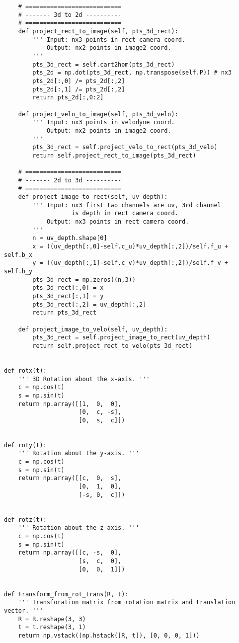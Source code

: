 \begin{lstlisting}
    # =========================== 
    # ------- 3d to 2d ---------- 
    # =========================== 
    def project_rect_to_image(self, pts_3d_rect):
        ''' Input: nx3 points in rect camera coord.
            Output: nx2 points in image2 coord.
        '''
        pts_3d_rect = self.cart2hom(pts_3d_rect)
        pts_2d = np.dot(pts_3d_rect, np.transpose(self.P)) # nx3
        pts_2d[:,0] /= pts_2d[:,2]
        pts_2d[:,1] /= pts_2d[:,2]
        return pts_2d[:,0:2]
    
    def project_velo_to_image(self, pts_3d_velo):
        ''' Input: nx3 points in velodyne coord.
            Output: nx2 points in image2 coord.
        '''
        pts_3d_rect = self.project_velo_to_rect(pts_3d_velo)
        return self.project_rect_to_image(pts_3d_rect)

    # =========================== 
    # ------- 2d to 3d ---------- 
    # =========================== 
    def project_image_to_rect(self, uv_depth):
        ''' Input: nx3 first two channels are uv, 3rd channel
                   is depth in rect camera coord.
            Output: nx3 points in rect camera coord.
        '''
        n = uv_depth.shape[0]
        x = ((uv_depth[:,0]-self.c_u)*uv_depth[:,2])/self.f_u + self.b_x
        y = ((uv_depth[:,1]-self.c_v)*uv_depth[:,2])/self.f_v + self.b_y
        pts_3d_rect = np.zeros((n,3))
        pts_3d_rect[:,0] = x
        pts_3d_rect[:,1] = y
        pts_3d_rect[:,2] = uv_depth[:,2]
        return pts_3d_rect

    def project_image_to_velo(self, uv_depth):
        pts_3d_rect = self.project_image_to_rect(uv_depth)
        return self.project_rect_to_velo(pts_3d_rect)

 
def rotx(t):
    ''' 3D Rotation about the x-axis. '''
    c = np.cos(t)
    s = np.sin(t)
    return np.array([[1,  0,  0],
                     [0,  c, -s],
                     [0,  s,  c]])


def roty(t):
    ''' Rotation about the y-axis. '''
    c = np.cos(t)
    s = np.sin(t)
    return np.array([[c,  0,  s],
                     [0,  1,  0],
                     [-s, 0,  c]])


def rotz(t):
    ''' Rotation about the z-axis. '''
    c = np.cos(t)
    s = np.sin(t)
    return np.array([[c, -s,  0],
                     [s,  c,  0],
                     [0,  0,  1]])


def transform_from_rot_trans(R, t):
    ''' Transforation matrix from rotation matrix and translation vector. '''
    R = R.reshape(3, 3)
    t = t.reshape(3, 1)
    return np.vstack((np.hstack([R, t]), [0, 0, 0, 1]))



\end{lstlisting}
